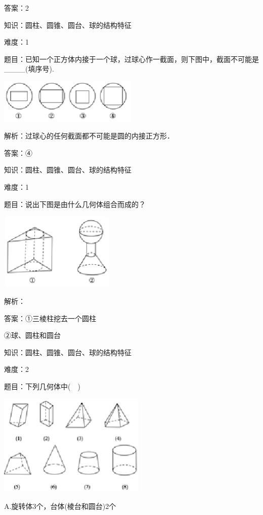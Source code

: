 \documentclass{article} %
\begin{document}
答案：2

知识：圆柱、圆锥、圆台、球的结构特征

难度：1

题目：已知一个正方体内接于一个球，过球心作一截面，则下图中，截面不可能是\_\_\_\_(填序号).

\includegraphics*[width=2.62in, height=0.83in, keepaspectratio=false]{image19}

解析：过球心的任何截面都不可能是圆的内接正方形．

答案：④

知识：圆柱、圆锥、圆台、球的结构特征

难度：1

题目：说出下图是由什么几何体组合而成的？

\includegraphics*[width=2.17in, height=1.45in, keepaspectratio=false]{image20}

解析：

答案：①三棱柱挖去一个圆柱

②球、圆柱和圆台

知识：圆柱、圆锥、圆台、球的结构特征

难度：2

题目：下列几何体中(　)

\includegraphics*[width=2.76in, height=1.92in, keepaspectratio=false]{image21}

A.旋转体3个，台体(棱台和圆台)2个
\end{document}
